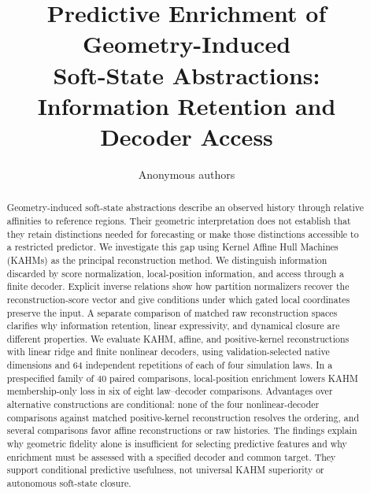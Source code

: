 \documentclass[10pt]{article}
\title{Predictive Enrichment of Geometry-Induced\\
Soft-State Abstractions:\\
Information Retention and Decoder Access}
\author{Anonymous authors}
\begin{document}
\maketitle
\begin{abstract}
Geometry-induced soft-state abstractions describe an observed history through relative affinities to reference regions. Their geometric interpretation does not establish that they retain distinctions needed for forecasting or make those distinctions accessible to a restricted predictor. We investigate this gap using Kernel Affine Hull Machines (KAHMs) as the principal reconstruction method. We distinguish information discarded by score normalization, local-position information, and access through a finite decoder. Explicit inverse relations show how partition normalizers recover the reconstruction-score vector and give conditions under which gated local coordinates preserve the input. A separate comparison of matched raw reconstruction spaces clarifies why information retention, linear expressivity, and dynamical closure are different properties. We evaluate KAHM, affine, and positive-kernel reconstructions with linear ridge and finite nonlinear decoders, using validation-selected native dimensions and 64 independent repetitions of each of four simulation laws. In a prespecified family of 40 paired comparisons, local-position enrichment lowers KAHM membership-only loss in six of eight law--decoder comparisons. Advantages over alternative constructions are conditional: none of the four nonlinear-decoder comparisons against matched positive-kernel reconstruction resolves the ordering, and several comparisons favor affine reconstructions or raw histories. The findings explain why geometric fidelity alone is insufficient for selecting predictive features and why enrichment must be assessed with a specified decoder and common target. They support conditional predictive usefulness, not universal KAHM superiority or autonomous soft-state closure.
\end{abstract}








\appendix

\end{document}
